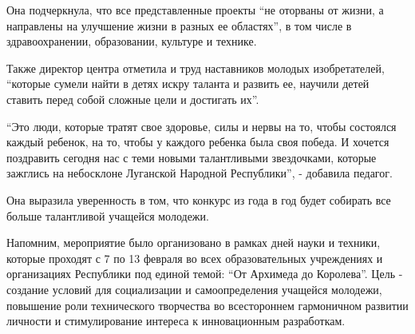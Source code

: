 Она подчеркнула, что все представленные проекты \enquote{не оторваны от жизни, а
направлены на улучшение жизни в разных ее областях}, в том числе в
здравоохранении, образовании, культуре и технике.

Также директор центра отметила и труд наставников молодых изобретателей,
\enquote{которые сумели найти в детях искру таланта и развить ее, научили детей ставить
перед собой сложные цели и достигать их}.

\enquote{Это люди, которые тратят свое здоровье, силы и нервы на то, чтобы состоялся
каждый ребенок, на то, чтобы у каждого ребенка была своя победа. И хочется
поздравить сегодня нас с теми новыми талантливыми звездочками, которые зажглись
на небосклоне Луганской Народной Республики}, - добавила педагог.

Она выразила уверенность в том, что конкурс из года в год будет собирать все
больше талантливой учащейся молодежи.

Напомним, мероприятие было организовано в рамках дней науки и техники, которые
проходят с 7 по 13 февраля во всех образовательных учреждениях и организациях
Республики под единой темой: \enquote{От Архимеда до Королева}. Цель - создание условий
для социализации и самоопределения учащейся молодежи, повышение роли
технического творчества во всестороннем гармоничном развитии личности и
стимулирование интереса к инновационным разработкам.

